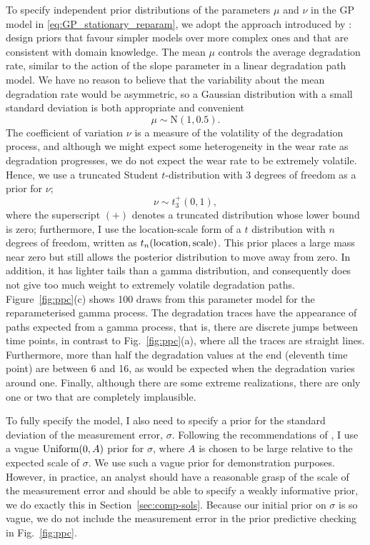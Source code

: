 To specify independent prior distributions of the parameters $\mu$ and $\nu$ in the GP model in  \eqref{eq:GP_stationary_reparam}, we adopt the approach introduced by \cite{Simpson_2017}: design priors that favour simpler models over more complex ones and that are consistent with domain knowledge. The mean $\mu$ controls the average degradation rate, similar to the action of the slope parameter in a linear degradation path model. We have no reason to believe that the variability about the mean degradation rate would be asymmetric, so a Gaussian distribution with a small standard deviation is both appropriate and convenient
\begin{equation*}
  \mu \sim \mbox{N}(1, 0.5).
\end{equation*}
The coefficient of variation $\nu$ is a measure of the volatility of the degradation process, and although we might expect some heterogeneity in the wear rate as degradation progresses, we do not expect the wear rate to be extremely volatile. Hence, we use a truncated Student $t$-distribution with 3 degrees of freedom as a prior for $\nu$;
\begin{equation*}
  \nu \sim t_3^{+}(0, 1),
\end{equation*}
where the superscript $(+)$ denotes a truncated distribution whose lower bound is zero; furthermore, I use the location-scale form of a $t$ distribution with $n$ degrees of freedom, written as $t_n(\hbox{location}, \hbox{scale})$. This prior places a large mass near zero but still allows the posterior distribution to move away from zero. In addition, it has lighter tails than a gamma distribution, and consequently does not give too much weight to extremely volatile degradation paths. Figure~\ref{fig:ppc}(c) shows 100 draws from this parameter model for the reparameterised gamma process. The degradation traces have the appearance of paths expected from a gamma process, that is, there are discrete jumps between time points, in contrast to Fig.~\ref{fig:ppc}(a), where all the traces are straight lines. Furthermore, more than half the degradation values at the end (eleventh time point) are between 6 and 16, as would be expected when the degradation varies around one. Finally, although there are some extreme realizations, there are only one or two that are completely implausible.

To fully specify the model, I also need to specify a prior for the standard deviation of the measurement error, $\sigma$. Following the recommendations of \citet[Chapter~17]{gelman_bayesian_2020}, I use a vague $\hbox{Uniform}(0, A)$ prior for $\sigma$, where $A$ is chosen to be large relative to the expected scale of $\sigma$. We use such a vague prior for demonstration purposes. However, in practice, an analyst should have a reasonable grasp of the scale of the measurement error and should be able to specify a weakly informative prior, we do exactly this in Section~\ref{sec:comp-sols}. Because our initial prior on $\sigma$ is so vague, we do not include the measurement error in the prior predictive checking in Fig.~\ref{fig:ppc}.

